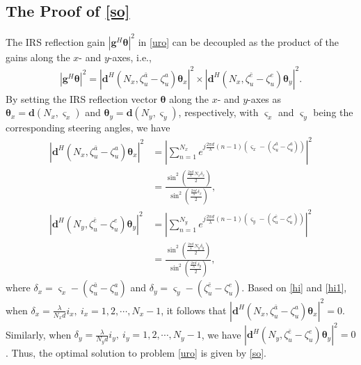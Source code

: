 \documentclass[10pt,final,doublecolumn]{IEEEtran}
\begin{document}
\begin{appendices}
\section{The Proof of \eqref{so}}
The IRS reflection gain $|{\mathbf{g}}^H
\boldsymbol{\theta}|^2$ in \eqref{uro} can be decoupled as the
product of the gains along the $x$- and $y$-axes, i.e.,
\begin{align}\label{hv}
|{\mathbf{g}}^H\boldsymbol{\theta}|^2=|\mathbf{d}^H(N_x,\zeta_u^{\bar{a}}-\zeta_u^{a})
\boldsymbol{\theta}_x|^2\times|\mathbf{d}^H(N_x,\zeta_u^{\bar{e}}-\zeta_u^{e})
\boldsymbol{\theta}_y|^2.
\end{align}
By setting the IRS reflection vector $\boldsymbol{\theta}$ along the $x$- and $y$-axes as $\boldsymbol{\theta}_x=\mathbf{d}(N_x,\varsigma_x)$ and $\boldsymbol{\theta}_y=\mathbf{d}(N_y,\varsigma_y)$, respectively,  with $\varsigma_x$ and $\varsigma_y$ being the corresponding steering angles, we have
\begin{align}
|\mathbf{d}^H(N_x,\zeta_u^{\bar{a}}-\zeta_u^{a})
\boldsymbol{\theta}_x|^2&=\left|\sum_{n=1}^{N_x}e^{j\frac{2\pi d}{\lambda}(n-1)(\varsigma_x-(\zeta_u^{\bar{a}}-\zeta_u^{a}))}\right|^2\nonumber\\
&=\frac{\sin^2(\frac{\frac{2\pi d}{\lambda}N_x\delta_x}{2})}{\sin^2(\frac{\frac{2\pi d}{\lambda}\delta_x}{2})},\label{hi}\\
|\mathbf{d}^H(N_y,\zeta_u^{\bar{e}}-\zeta_u^{e})
\boldsymbol{\theta}_y|^2&=\left|\sum_{n=1}^{N_y}e^{j\frac{2\pi d}{\lambda}(n-1)(\varsigma_y-(\zeta_u^{\bar{e}}-\zeta_u^{e}))}\right|^2\nonumber\\
&=\frac{\sin^2(\frac{\frac{2\pi d}{\lambda}N_y\delta_y}{2})}{\sin^2(\frac{\frac{2\pi d}{\lambda}\delta_y}{2})},\label{hi1}
\end{align}
where $\delta_x=\varsigma_x-(\zeta_u^{\bar{a}}-\zeta_u^{a})$ and $\delta_y=\varsigma_y-(\zeta_u^{\bar{e}}-\zeta_u^{e})$. Based on \eqref{hi} and \eqref{hi1}, when  $\delta_x=\frac{\lambda}{N_xd}i_x,~i_x=1,2,\cdots,N_x-1$, it follows that $
|\mathbf{d}^H(N_x,\zeta_u^{\bar{a}}-\zeta_u^{a})
\boldsymbol{\theta}_x|^2=0$.
Similarly, when $\delta_y=\frac{\lambda}{N_yd}i_y,~i_y=1,2,\cdots,N_y-1$, we have
$|\mathbf{d}^H(N_y,\zeta_u^{\bar{e}}-\zeta_u^{e})
\boldsymbol{\theta}_y|^2=0$.
Thus, the optimal solution to problem \eqref{uro} is
given by \eqref{so}.
\end{appendices}
\end{document}
